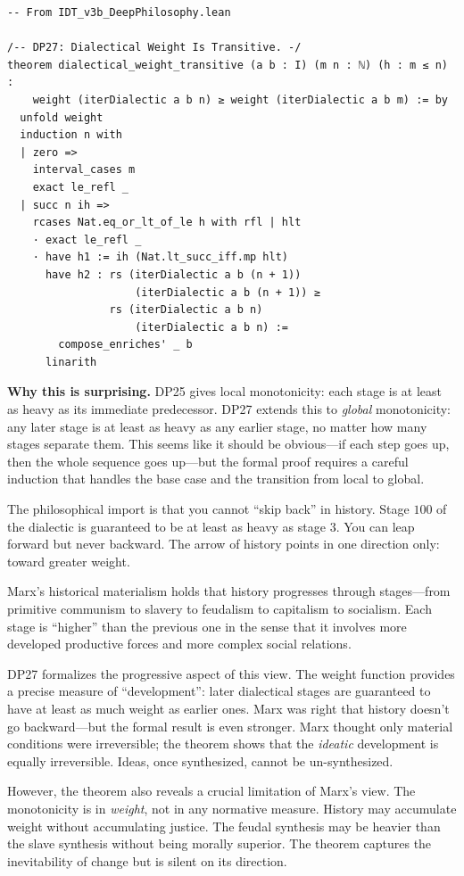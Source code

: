 \begin{lstlisting}
-- From IDT_v3b_DeepPhilosophy.lean

/-- DP27: Dialectical Weight Is Transitive. -/
theorem dialectical_weight_transitive (a b : I) (m n : ℕ) (h : m ≤ n) :
    weight (iterDialectic a b n) ≥ weight (iterDialectic a b m) := by
  unfold weight
  induction n with
  | zero =>
    interval_cases m
    exact le_refl _
  | succ n ih =>
    rcases Nat.eq_or_lt_of_le h with rfl | hlt
    · exact le_refl _
    · have h1 := ih (Nat.lt_succ_iff.mp hlt)
      have h2 : rs (iterDialectic a b (n + 1))
                    (iterDialectic a b (n + 1)) ≥
                rs (iterDialectic a b n)
                    (iterDialectic a b n) :=
        compose_enriches' _ b
      linarith
\end{lstlisting}

\begin{surprisebox}
\noindent\textbf{Why this is surprising.}
DP25 gives local monotonicity: each stage is at least as heavy as its
immediate predecessor.  DP27 extends this to \emph{global} monotonicity:
any later stage is at least as heavy as any earlier stage, no matter how
many stages separate them.  This seems like it should be obvious---if
each step goes up, then the whole sequence goes up---but the formal
proof requires a careful induction that handles the base case and the
transition from local to global.

The philosophical import is that you cannot ``skip back'' in history.
Stage $100$ of the dialectic is guaranteed to be at least as heavy as
stage $3$.  You can leap forward but never backward.  The arrow of
history points in one direction only: toward greater weight.
\end{surprisebox}

\begin{interpretation}
\label{interp:marx-formalized}
Marx's historical materialism holds that history progresses through
stages---from primitive communism to slavery to feudalism to capitalism
to socialism.  Each stage is ``higher'' than the previous one in the
sense that it involves more developed productive forces and more
complex social relations.

DP27 formalizes the progressive aspect of this view.  The weight
function provides a precise measure of ``development'': later
dialectical stages are guaranteed to have at least as much weight as
earlier ones.  Marx was right that history doesn't go backward---but
the formal result is even stronger.  Marx thought only material
conditions were irreversible; the theorem shows that the \emph{ideatic}
development is equally irreversible.  Ideas, once synthesized, cannot
be un-synthesized.

However, the theorem also reveals a crucial limitation of Marx's
view.  The monotonicity is in \emph{weight}, not in any normative
measure.  History may accumulate weight without accumulating justice.
The feudal synthesis may be heavier than the slave synthesis without
being morally superior.  The theorem captures the inevitability of
change but is silent on its direction.
\end{interpretation}

